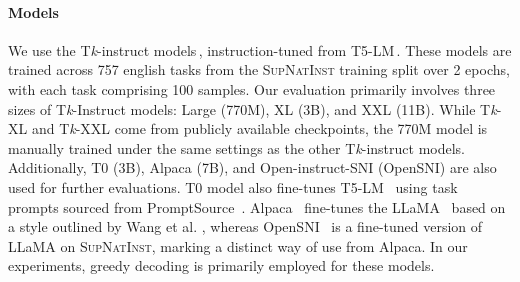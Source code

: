 \vspace{-5pt}
\paragraph{Models} We use the T\textit{k}-instruct models\,\citep{sni_dataset}, instruction-tuned from T5-LM\,\citep{t5-lm}. These models are trained across 757 english tasks from the \textsc{SupNatInst} training split over 2 epochs, with each task comprising 100 samples.
Our evaluation primarily involves three sizes of T\textit{k}-Instruct models: Large (770M), XL (3B), and XXL (11B). While T\textit{k}-XL and T\textit{k}-XXL come from publicly available checkpoints, the 770M model is manually trained under the same settings as the other T\textit{k}-instruct models.
Additionally, T0 (3B), Alpaca (7B), and Open-instruct-SNI (OpenSNI) are also used for further evaluations. T0 model also fine-tunes T5-LM \,\citep{t5-lm} using task prompts sourced from PromptSource \,\citep{promptsource}. Alpaca \,\citep{alpaca} fine-tunes the LLaMA \,\citep{llama} based on a style outlined by Wang et al. \citep{self_instruct}, whereas OpenSNI \,\citep{tulu} is a fine-tuned version of LLaMA on \textsc{SupNatInst}, marking a distinct way of use from Alpaca.
In our experiments, greedy decoding is primarily employed for these models.

\vspace{-5pt}
